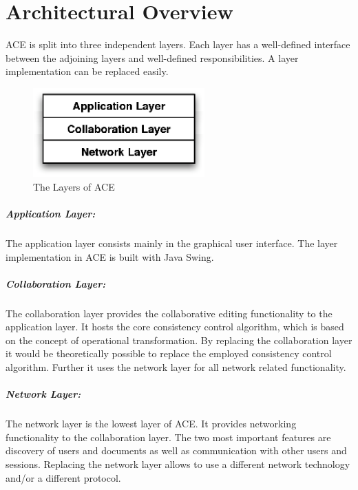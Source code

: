 \chapter{Architectural Overview}
\label{chapter:archoverview}

ACE is split into three independent layers. Each layer has a well-defined 
interface between the adjoining layers and well-defined responsibilities. 
A layer implementation can be replaced easily.

\begin{figure}[H]
 \centering
 \includegraphics[width=6.6cm,height=3.42cm]{../images/layers.eps}
 \caption{The Layers of ACE}
\end{figure}

\paragraph{Application Layer:} The application layer consists mainly in the 
graphical user interface. The layer implementation in ACE is built with
Java Swing.

\paragraph{Collaboration Layer:} The collaboration layer provides the
collaborative editing functionality to the application layer. It hosts the core
consistency control algorithm, which is based on the concept of operational 
transformation. By replacing the collaboration layer it would be theoretically 
possible to replace the employed consistency control algorithm. Further it uses 
the network layer for all network related functionality.

\paragraph{Network Layer:} The network layer is the lowest layer of ACE. It 
provides networking functionality to the collaboration layer. The two most 
important features are discovery of users and documents as well as communication 
with other users and sessions. Replacing the network layer allows to use a 
different network technology and/or a different protocol.



